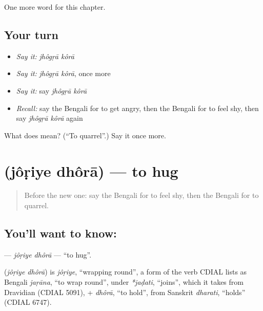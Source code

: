 \begin{grammarlens}[title={What you've built}]
One more word for this chapter.
\end{grammarlens}

\subsection*{Your turn}
\begin{itemize}
\raggedright
  \item \emph{Say it:} \emph{jhôgṛā kôrā}
  \item \emph{Say it:} \emph{jhôgṛā kôrā}, once more
  \item \emph{Say it:} say \emph{jhôgṛā kôrā}
  \item \emph{Recall:} say the Bengali for to get angry, then the Bengali for to feel shy, then say \emph{jhôgṛā kôrā} again
\end{itemize}

\begin{tcolorbox}[breakable,colback=teal!4,colframe=teal!35!black,title={Before you move on}]
What does   mean? (\textquotedblleft{}To quarrel\textquotedblright{}.) Say it once more.
\end{tcolorbox}
\section[\texorpdfstring{\bn{জড়িয়ে} \bn{ধরা} (jôṛiye dhôrā)}{জড়িয়ে ধরা (jôṛiye dhôrā)}]{  (jôṛiye dhôrā) — to hug}

\label{lesson:BN-C211-joriye-dhora}



\begin{quote}
Before the new one: say the Bengali for to feel shy, then the Bengali for to quarrel.
\end{quote}

\subsection*{You'll want to know:  }
\textbf{ } — \emph{jôṛiye dhôrā} — \textquotedblleft{}to hug\textquotedblright{}.

\begin{cousinweb}
\textbf{ } (\emph{jôṛiye dhôrā}) is \emph{jôṛiye}, \textquotedblleft{}wrapping round\textquotedblright{}, a form of the verb CDIAL lists as Bengali \emph{jaṛāna}, \textquotedblleft{}to wrap round\textquotedblright{}, under \emph{*jaḍati}, \textquotedblleft{}joins\textquotedblright{}, which it takes from Dravidian (CDIAL 5091), + \emph{dhôrā}, \textquotedblleft{}to hold\textquotedblright{}, from Sanskrit \emph{dharati}, \textquotedblleft{}holds\textquotedblright{} (CDIAL 6747).
\end{cousinweb}

